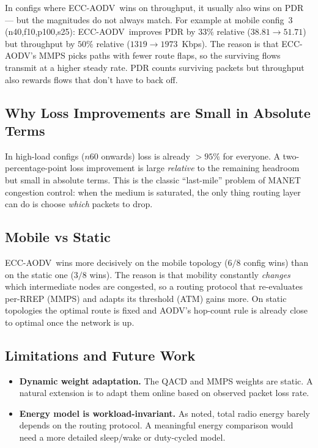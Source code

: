 \documentclass[11pt,a4paper]{article}
\newcommand{\ecc}{ECC-AODV}
\newcommand{\aodv}{AODV}
\begin{document}
In configs where \ecc\ wins on throughput, it usually also wins on PDR — but
the magnitudes do not always match. For example at mobile config~$3$
(n40,f10,p100,s25): \ecc\ improves PDR by $33\%$ relative ($38.81 \to 51.71$)
but throughput by $50\%$ relative ($1319 \to 1973$~Kbps). The reason is that
\ecc's MMPS picks paths with fewer route flaps, so the surviving flows
transmit at a higher steady rate. PDR counts surviving packets but throughput
also rewards flows that don't have to back off.

\subsection{Why Loss Improvements are Small in Absolute Terms}

In high-load configs ($n60$ onwards) loss is already $>95\%$ for everyone.
A two-percentage-point loss improvement is large \emph{relative} to the
remaining headroom but small in absolute terms. This is the classic
``last-mile'' problem of MANET congestion control: when the medium is
saturated, the only thing routing layer can do is choose \emph{which} packets
to drop.

\subsection{Mobile vs Static}

\ecc\ wins more decisively on the mobile topology ($6/8$ config wins) than on
the static one ($3/8$ wins). The reason is that mobility constantly
\emph{changes} which intermediate nodes are congested, so a routing protocol
that re-evaluates per-RREP (MMPS) and adapts its threshold (ATM) gains more.
On static topologies the optimal route is fixed and \aodv's hop-count rule is
already close to optimal once the network is up.

\subsection{Limitations and Future Work}

\begin{itemize}


    \item \textbf{Dynamic weight adaptation.} The QACD and MMPS weights are
          static. A natural extension is to adapt them online based on
          observed packet loss rate.
    \item \textbf{Energy model is workload-invariant.} As noted, total radio
          energy barely depends on the routing protocol. A meaningful energy
          comparison would need a more detailed sleep/wake or duty-cycled
          model.
\end{itemize}
\end{document}
